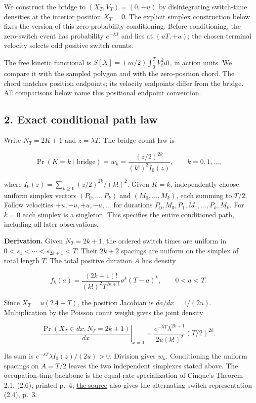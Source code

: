 \documentclass[11pt,a4paper]{article}
\begin{document}
We construct the bridge to \((X_T,V_T)=(0,-u)\) by disintegrating
switch-time densities at the interior position \(X_T=0\). The explicit
simplex construction below fixes the version of this zero-probability
conditioning. Before conditioning, the zero-switch event has probability
\(e^{-\lambda T}\) and lies at \((uT,+u)\); the chosen terminal velocity
selects odd positive switch counts.

The free kinetic functional is \(S[X]=(m/2)\int_0^T V_t^2dt\), in action
units. We compare it with the sampled polygon and with the zero-position
chord. The chord matches position endpoints; its velocity endpoints
differ from the bridge. All comparisons below name this positional
endpoint convention.

\hypertarget{exact-conditional-path-law}{%
\subsection{2. Exact conditional path
law}\label{exact-conditional-path-law}}

Write \(N_T=2K+1\) and \(z=\lambda T\). The bridge count law is

\[\boxed{\Pr(K=k\mid\text{bridge})=
 w_k=\frac{(z/2)^{2k}}{(k!)^2 I_0(z)},\qquad k=0,1,\ldots,}\]

where \(I_0(z)=\sum_{k\ge0}(z/2)^{2k}/(k!)^2\). Given \(K=k\),
independently choose uniform simplex vectors \((P_0,\ldots,P_k)\) and
\((M_0,\ldots,M_k)\), each summing to \(T/2\). Follow velocities
\(+u,-u,+u,-u,\ldots\) for durations \(P_0,M_0,P_1,M_1,\ldots,P_k,M_k\).
For \(k=0\) each simplex is a singleton. This specifies the entire
conditioned path, including all later observations.

\textbf{Derivation.} Given \(N_T=2k+1\), the ordered switch times are
uniform in \(0<s_1<\cdots<s_{2k+1}<T\). Their \(2k+2\) spacings are
uniform on the simplex of total length \(T\). The total positive
duration \(A\) has density

\[f_k(a)=\frac{(2k+1)!}{(k!)^2 T^{2k+1}}
              a^k(T-a)^k,\qquad 0<a<T.\]

Since \(X_T=u(2A-T)\), the position Jacobian is \(da/dx=1/(2u)\).
Multiplication by the Poisson count weight gives the joint density

\[\left.\frac{\Pr(X_T\in dx,N_T=2k+1)}{dx}\right|_{x=0}
 =\frac{e^{-\lambda T}\lambda^{2k+1}}{2u(k!)^2}(T/2)^{2k}.\]

Its sum is \(e^{-\lambda T}\lambda I_0(z)/(2u)>0\). Division gives
\(w_k\). Conditioning the uniform spacings on \(A=T/2\) leaves the two
independent simplexes stated above. The occupation-time backbone is the
equal-rate specialization of Cinque's Theorem 2.1, (2.6), printed p.~4;
\href{https://arxiv.org/abs/2202.01904v1}{the source} also gives the
alternating switch representation (2.4), p.~3.
\end{document}
